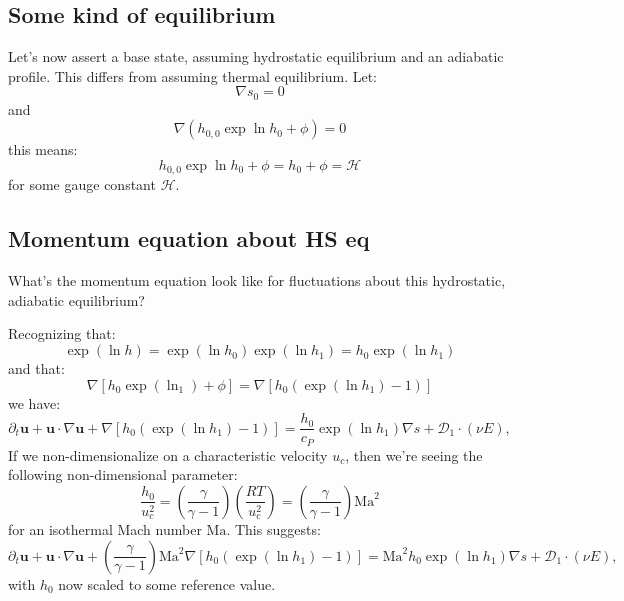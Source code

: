 \documentclass{aastex62}
\newcommand{\del}{\nabla}
\renewcommand{\vec}{\boldsymbol}
\newcommand{\scrD}{\mathcal{D}}
\newcommand{\scrH}{\mathcal{H}}
\begin{document}
\subsection{Some kind of equilibrium}
Let's now assert a base state, assuming hydrostatic equilibrium and an adiabatic profile.  This differs from assuming thermal equilibrium.
Let:
\begin{equation}
  \del s_0 = 0
\end{equation}
and
\begin{equation}
  \del(h_{0,0}\exp{\ln h_0} + \phi) = 0
\end{equation}
this means:
\begin{equation}
  h_{0,0}\exp{\ln h_0} + \phi = h_0 + \phi = \scrH
\end{equation}
for some gauge constant $\scrH$.

\subsection{Momentum equation about HS eq}

What's the momentum equation look like for fluctuations about this hydrostatic, adiabatic equilibrium?

Recognizing that:
\begin{equation}
  \exp{(\ln h)} = \exp{(\ln h_0)}\exp{(\ln h_1)} = h_0 \exp{(\ln h_1)}
\end{equation}
and that:
\begin{equation}
  \del \left[h_0 \exp{(\ln_1)} + \phi\right] = \del\left[h_0\left(\exp{(\ln h_1)}-1\right)\right]
\end{equation}
we have:
\begin{equation}
  \partial_t \vec{u} + \vec{u}\cdot \del\vec{u} + \del\left[h_0\left(\exp{(\ln h_1)}-1\right)\right] = \frac{h_0}{c_P}\exp{(\ln h_1)}\del s + \vec{\scrD}_1\cdot(\nu E),
\end{equation}
If we non-dimensionalize on a characteristic velocity $u_c$, then we're seeing the following non-dimensional parameter:
\begin{equation}
  \frac{h_0}{u_c^2} = \left(\frac{\gamma}{\gamma-1}\right)\left(\frac{R T}{u_c^2}\right) = \left(\frac{\gamma}{\gamma-1}\right) \mathrm{Ma}^2
\end{equation}
for an isothermal Mach number $\mathrm{Ma}$.  This suggests:
\begin{equation}
  \partial_t \vec{u} + \vec{u}\cdot \del\vec{u} + \left(\frac{\gamma}{\gamma-1}\right) \mathrm{Ma}^2 \del\left[h_0\left(\exp{(\ln h_1)}-1\right)\right] = \mathrm{Ma}^2 h_0 \exp{(\ln h_1)}\del s + \vec{\scrD}_1\cdot(\nu E),
\end{equation}
with $h_0$ now scaled to some reference value.
\end{document}
